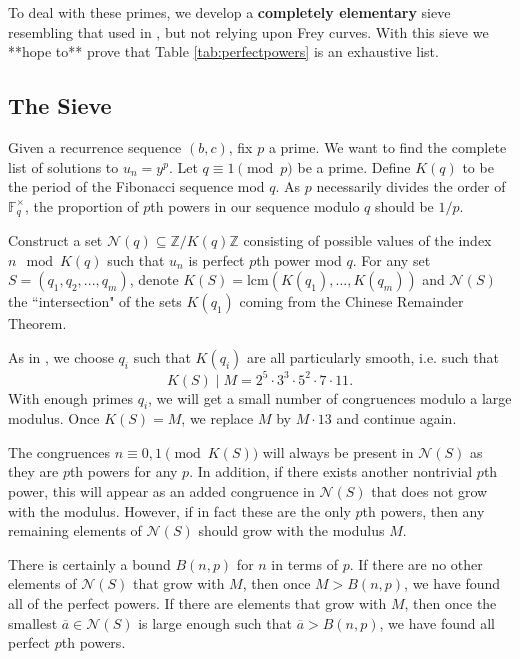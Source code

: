 \documentclass[12pt]{amsart}
\theoremstyle{definition}
\def\F{{\mathbb F}}
\def\N{{\mathcal N}}
\def\Z{{\mathbb Z}}
\newcommand{\lcm}{\text{lcm}}
\renewcommand{\bar}{\overline}
\begin{document}
To deal with these primes, we develop a \textbf{completely elementary} sieve resembling that used in \cite{siksek06}, but not relying upon Frey curves.  With this sieve we **hope to** prove that Table \ref{tab:perfectpowers} is an exhaustive list.

\subsection{The Sieve}

Given a recurrence sequence $(b,c)$, fix $p$ a prime.  We want to find the complete list of solutions to $u_n = y^p$.  Let $q \equiv 1 \pmod{p}$ be a prime.  Define $K(q)$ to be the period of the Fibonacci sequence mod $q$.  As $p$ necessarily divides the order of $\F_q^\times$, the proportion of $p$th powers in our sequence modulo $q$ should be $1/p$.

Construct a set $\N(q) \subseteq \Z/K(q)\Z $ consisting of possible values of the index $n \mod{K(q)}$ such that $u_n$ is perfect $p$th power mod $q$.  For any set $S = (q_1,q_2,...,q_m)$, denote $K(S) = \lcm(K(q_1),...,K(q_m))$ and $\N(S)$ the ``intersection" of the sets $K(q_1)$ coming from the Chinese Remainder Theorem.


As in \cite{siksek06}, we choose $q_i$ such that $K(q_i)$ are all particularly smooth, i.e. such that 
\[K(S) \mid M = 2^5 \cdot 3^3 \cdot 5^2 \cdot 7 \cdot 11.\]
With enough primes $q_i$, we will get a small number of congruences modulo a large modulus.  Once $K(S) = M$, we replace $M$ by $M  \cdot 13$ and continue again. 

The congruences $n \equiv 0,1 \pmod{K(S)}$ will always be present in $\N(S)$ as they are $p$th powers for any $p$.  In addition, if there exists another nontrivial $p$th power, this will appear as an added congruence in $\N(S)$ that does not grow with the modulus.  However, if in fact these are the only $p$th powers, then any remaining elements of $\N(S)$ should grow with the modulus $M$.  

There is certainly a bound $B(n,p)$ for $n$ in terms of $p$.  If there are no other elements of $\N(S)$ that grow with $M$, then once $M >B(n,p)$, we have found all of the perfect powers.  If there are elements that grow with $M$, then once the smallest $\bar{a} \in \N(S)$ is large enough such that $\bar{a} > B(n,p)$, we have found all perfect $p$th powers.






\end{document}
